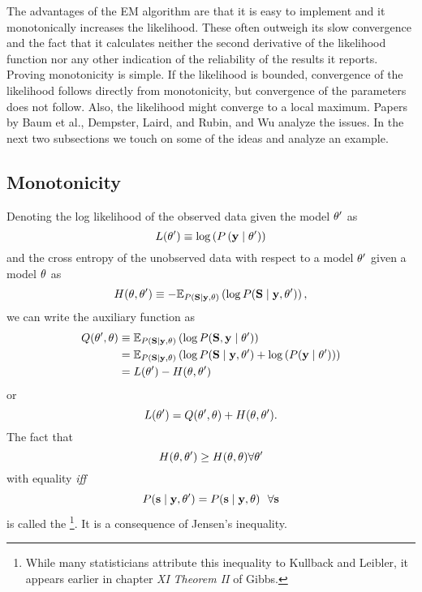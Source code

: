 The advantages of the EM algorithm are that it is easy to implement
and it monotonically increases the likelihood.  These often outweigh
its slow convergence and the fact that it calculates neither the
second derivative of the likelihood function nor any other indication
of the reliability of the results it reports.  Proving monotonicity is
simple.  If the likelihood is bounded, convergence of the likelihood
follows directly from monotonicity, but convergence of the parameters
does not follow.  Also, the likelihood might converge to a local
maximum.  Papers by Baum et al.\cite{Baum70}, Dempster, Laird, and
Rubin\cite{Dempster77}, and Wu\cite{Wu83} analyze the issues.  In the
next two subsections we touch on some of the ideas and analyze an
example.

\subsection{Monotonicity}

Denoting the log likelihood of the observed data given the model
$\theta'$ as
\begin{equation*}
  L(\theta') \equiv \log \left( P \left(\mathbf{y}\mid \theta' \right)\right)
\end{equation*}
and the cross entropy of the unobserved data with respect to a model
$\theta'$ given a model $\theta$ as
\begin{equation*}
  H(\theta, \theta') \equiv - \mathbb{E}_{P
    \left({\bf S}\mid \mathbf{y},\theta \right)} \left( \log P({\bf S}\mid \mathbf{y},\theta')
  \right),
\end{equation*}
we can write the auxiliary function as
\begin{align*}
  Q(\theta',\theta) &\equiv \mathbb{E}_{P \left({\bf S}\mid \mathbf{y} ,\theta\right)}
  \left( \log P({\bf S},\mathbf{y}\mid \theta') \right)\\
  &= \mathbb{E}_{P \left({\bf S}\mid \mathbf{y} ,\theta \right)} \left( \log
    P({\bf S}\mid \mathbf{y},\theta') + \log \left( P(\mathbf{y}\mid \theta') \right)
  \right)\\
  &= L(\theta') - H(\theta, \theta')
\end{align*}
or
\begin{equation}
  \label{eq:LQH}
   L(\theta') = Q(\theta',\theta) + H(\theta,
   \theta').
\end{equation}
The fact that
\begin{equation}
  \label{eq:GibbsIE}
  H(\theta, \theta') \geq  H(\theta, \theta)
  \forall \theta'
\end{equation}
with equality \emph{iff}
\begin{equation*}
  P({\bf s}\mid \mathbf{y},\theta') =  P({\bf s}\mid \mathbf{y},\theta) ~~ \forall {\bf s}
\end{equation*}
is called the \emph{}\footnote{While many
  statisticians attribute this inequality to Kullback and
  Leibler\cite{Kullback51}, it appears earlier in chapter {\em XI}
  {\em Theorem II} of Gibbs\cite{Gibbs}.}.  It is a consequence of
 Jensen's inequality.

